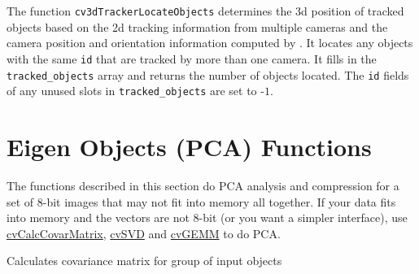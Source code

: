 {The function \texttt{cv3dTrackerLocateObjects} determines the 3d position of tracked objects based on the 2d tracking information from multiple cameras and the camera position and orientation information computed by . It locates any objects with the same \texttt{id} that are tracked by more than one camera. It fills in the \texttt{tracked\_objects} array and returns the number of objects located. The \texttt{id} fields of any unused slots in \texttt{tracked\_objects} are set to -$1$.

\section{Eigen Objects (PCA) Functions}

The functions described in this section do PCA analysis and compression for a set of 8-bit images that may not fit into memory all together. If your data fits into memory and the vectors are not 8-bit (or you want a simpler interface), use \href{http://opencvlibrary.sourceforge.net/OpenCVRef\_BasicFuncs.htm}{cvCalcCovarMatrix}, \href{http://opencvlibrary.sourceforge.net/OpenCVRef\_BasicFuncs.htm}{cvSVD} and \href{http://opencvlibrary.sourceforge.net/OpenCVRef\_BasicFuncs.htm}{cvGEMM} to do PCA.


Calculates covariance matrix for group of input objects


\begin{description}
\end{description}

}
